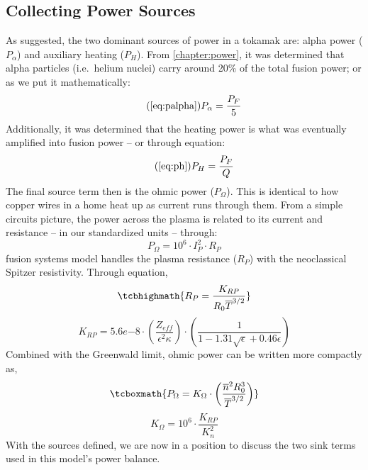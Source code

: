 \subsection{Collecting Power Sources}

As suggested, the two dominant sources of power in a tokamak are: alpha power ($P_\alpha$) and auxiliary heating ($P_H$). From \cref{chapter:power}, it was determined that alpha particles (i.e.\ helium nuclei) carry around 20\% of the total fusion power; or as we put it mathematically:
\begin{equation}
	\tag{\ref{eq:palpha}}
	P_\alpha = \frac{P_F}{5}
\end{equation}
Additionally, it was determined that the heating power is what was eventually amplified into fusion power -- or through equation:
\begin{equation}
	\tag{\ref{eq:ph}}
	P_H = \frac{P_F}{Q}
\end{equation}
The final source term then is the ohmic power ($P_\Omega$). This is identical to how copper wires in a home heat up as current runs through them. From a simple circuits picture, the power across the plasma is related to its current and resistance -- in our standardized units -- through:\cite{process}
\begin{equation}
	\label{eq:pohmic_basic}
	P_\Omega = 10^6 \cdot I_P^2 \cdot R_P
\end{equation}
 fusion systems model handles the plasma resistance ($R_P$)  with the neoclassical Spitzer resistivity. Through equation,
\begin{equation}
	\label{eq:rp}
	\tcbhighmath{
	R_P = \frac{K_{RP}}{R_0 \overline T ^ {3/2}}
	}
\end{equation}
\begin{equation}
	K_{RP} = 5.6e{-8} \cdot \left( \frac{ Z_{eff} }{ \epsilon^2 \kappa } \right) \cdot \left( \frac{1}{ 1 - 1.31 \sqrt{ \epsilon } + 0.46 \epsilon } \right)
\end{equation}
Combined with the Greenwald limit, ohmic power can be written more compactly as,
\begin{equation}
	\label{eq:pohmic}
	\tcboxmath{
	P_\Omega = K_\Omega \cdot \left( \frac{ \overline n ^ 2 R_0^3 }{\overline T ^ {3/2}} \right)
	}
\end{equation}
\begin{equation}
	K_\Omega = 10^6 \cdot \frac{K_{RP}}{K_n^2}
\end{equation}
With the sources defined, we are now in a position to discuss the two sink terms used in this model's power balance.

